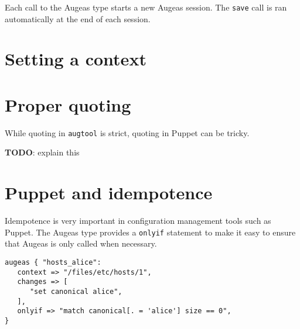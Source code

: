 \begin{quote}

\end{quote}
 Each call to the Augeas type starts a new Augeas session. The \verb!save! call is ran automatically at the end of each session.

\section{Setting a context}

\section{Proper quoting}

While quoting in \verb!augtool! is strict, quoting in Puppet can be tricky.

\textbf{TODO}: explain this

\section{Puppet and idempotence}

Idempotence is very important in configuration management tools such as Puppet. The Augeas type provides a \verb!onlyif! statement to make it easy to ensure that Augeas is only called when necessary.

\begin{verbatim}
augeas { "hosts_alice":
   context => "/files/etc/hosts/1",
   changes => [
      "set canonical alice",
   ],
   onlyif => "match canonical[. = 'alice'] size == 0",
}
\end{verbatim}

\begin{quote}
\end{quote}

